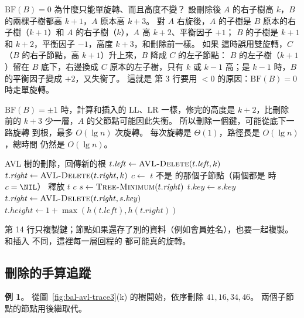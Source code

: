 $\mathrm{BF}(B) = 0$ 為什麼只能單旋轉、而且高度不變？ 設刪除後 $A$ 的右子樹高
$k$，$B$ 的兩棵子樹都高 $k + 1$，$A$ 原本高 $k + 3$。 對 $A$ 右旋後，$A$ 的子樹是
$B$ 原本的右子樹（$k + 1$）和 $A$ 的右子樹（$k$），$A$ 高 $k + 2$、平衡因子 $+1$；
$B$ 的子樹是 $k + 1$ 和 $k + 2$，平衡因子 $-1$，高度 $k + 3$，和刪除前一樣。 如果
這時誤用雙旋轉，$C$（$B$ 的右子節點，高 $k + 1$）升上來，$B$ 降成 $C$ 的左子節點：
$B$ 的左子樹（$k + 1$）留在 $B$ 底下，右邊換成 $C$ 原本的左子樹，只有 $k$ 或 $k - 1$
高；是 $k - 1$ 時，$B$ 的平衡因子變成 $+2$，又失衡了。 這就是  第 3 行要用
$< 0$ 的原因：$\mathrm{BF}(B) = 0$ 時走單旋轉。

$\mathrm{BF}(B) = \pm 1$ 時，計算和插入的 LL、LR 一樣，修完的高度是 $k + 2$，比刪除
前的 $k + 3$ 少一層，$A$ 的父節點可能因此失衡。 所以刪除一個鍵，可能從底下一路旋轉
到根，最多 $O(\lg n)$ 次旋轉。 每次旋轉是 $\Theta(1)$，路徑長是 $O(\lg n)$，總時間
仍然是 $O(\lg n)$。

\begin{pseudo}[label=alg:bal-avl-delete]{AVL 樹的刪除，回傳新的根}
        \State \Return \NIL {}
    \EndIf
        \State $t.\mathit{left} \gets \Call{AVL-Delete}{t.\mathit{left}, k}$
        \State $t.\mathit{right} \gets \Call{AVL-Delete}{t.\mathit{right}, k}$
        \State $c \gets$ $t$ 不是 \NIL 的那個子節點（兩個都是 \NIL 時 $c = \NIL$）
        \State 釋放 $t$
        \State \Return $c$
    \Else
        \State $s \gets \Call{Tree-Minimum}{t.\mathit{right}}$ 
        \State $t.\mathit{key} \gets s.\mathit{key}$
        \State $t.\mathit{right} \gets \Call{AVL-Delete}{t.\mathit{right}, s.\mathit{key}}$
    \EndIf
    \State $t.\mathit{height} \gets 1 + \max(h(t.\mathit{left}), h(t.\mathit{right}))$
    \State \Return {}
\EndFunction
\end{pseudo}

第 14 行只複製鍵；節點如果還存了別的資料（例如會員姓名），也要一起複製。 和插入
不同，這裡每一層回程的  都可能真的旋轉。

\subsection{刪除的手算追蹤}
\label{sec:bal-avl-deltrace}

\textbf{例 1}。 從圖~\ref{fig:bal-avl-trace3}(k) 的樹開始，依序刪除
$41, 16, 34, 46$。 兩個子節點的節點用後繼取代。

